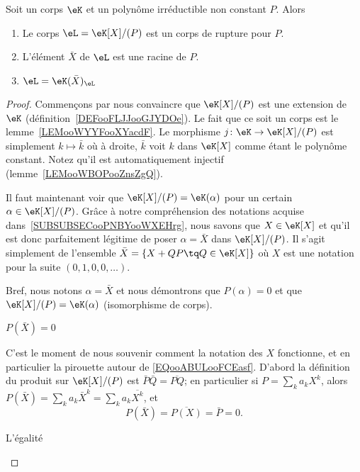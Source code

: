 \begin{proposition}        \label{PROPooUBIIooGZQyeE}
    Soit un corps \( \eK\) et un polynôme irréductible non constant \( P\). Alors
    \begin{enumerate}
        \item
            Le corps \( \eL=\eK[X]/(P)\) est un corps de rupture pour \( P\).
        \item
            L'élément \( \bar X\) de \( \eL\) est une racine de \( P\).
        \item
            \( \eL=\eK(\bar X)_{\eL}\)
    \end{enumerate}
\end{proposition}

\begin{proof}
    Commençons par nous convaincre que \( \eK[X]/(P)\) est une extension de \( \eK\) (définition~\ref{DEFooFLJJooGJYDOe}). Le fait que ce soit un corps est le lemme~\ref{LEMooWYYFooXYacdF}. Le morphisme \( j\colon \eK\to \eK[X]/(P)\) est simplement \( k\mapsto \bar k\) où à droite, \( \bar k\) voit \( k\) dans \( \eK[X]\) comme étant le polynôme constant. Notez qu'il est automatiquement injectif (lemme~\ref{LEMooWBOPooZnsZgQ}).

    Il faut maintenant voir que \( \eK[X]/(P)=\eK(\alpha)\) pour un certain \( \alpha\in \eK[X]/(P)\). Grâce à notre compréhension des notations acquise dans~\ref{SUBSUBSECooPNBYooWXEHrg}, nous savons que \( X\in\eK[X]\) et qu'il est donc parfaitement légitime de poser \( \alpha=\bar X\) dans \( \eK[X]/(P)\). Il s'agit simplement de l'ensemble \( \bar X=\{ X+QP\tq Q\in \eK[X] \}\) où \( X\) est une notation pour la suite \( (0,1,0,0,\ldots)\).

    Bref, nous notons \( \alpha=\bar X\) et nous démontrons que \( P(\alpha)=0\) et que \( \eK[X]/(P)=\eK(\alpha)\) (isomorphisme de corps).
    \begin{subproof}
        \item[\( P(\bar X)=0\)]

            C'est le moment de nous souvenir comment la notation des \( X\) fonctionne, et en particulier la pirouette autour de \eqref{EQooABULooFCEasf}. D'abord la définition du produit sur \( \eK[X]/(P)\) est \( \bar P\bar Q=\overline{ PQ }\); en particulier si \( P=\sum_ka_kX^k\), alors \( P(\bar X)=\sum_ka_k\bar X^k=\sum_ka_k\overline{ X^k }\), et
            \begin{equation}
                P(\bar X)=\overline{ P(X) }=\bar P=0.
            \end{equation}
        \item[L'égalité]


\end{subproof}
\end{proof}
